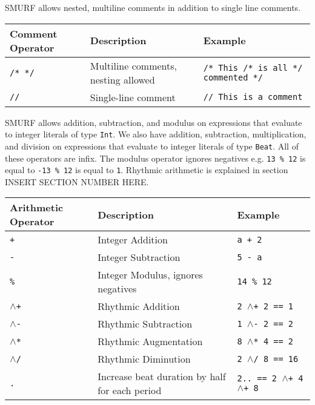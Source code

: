 SMURF allows nested, multiline comments in addition to single line comments.
\begin{table} [H]
\centering
\begin{tabularx}{\textwidth}{lXl}
\hline\hline
Comment Operator & Description & Example \\
\hline\hline
  \texttt{/* */} & Multiline comments, nesting allowed & \texttt{/* This /* is all */ commented */} \\ \hline
  \texttt{//} & Single-line comment & \texttt{// This is a comment} \\ \hline
\end{tabularx}
\end{table}

SMURF allows addition, subtraction, and modulus on expressions that evaluate to integer literals of type \texttt{Int}. We also have addition, subtraction,
multiplication, and division on expressions that evaluate to integer literals of type \texttt{Beat}. All of these operators are infix.
The modulus operator ignores negatives e.g. \texttt{13 \% 12} is equal to \texttt{-13 \% 12} is equal to \texttt{1}. Rhythmic arithmetic is explained
in section INSERT SECTION NUMBER HERE.
\begin{table} [H]
\centering
\begin{tabularx}{\textwidth}{lXX}
\hline\hline
Arithmetic Operator & Description & Example \\
\hline\hline
  \texttt{+} & Integer Addition  & \texttt{a + 2} \\ \hline
  \texttt{-} & Integer Subtraction  & \texttt{5 - a} \\ \hline 
  \texttt{\%} & Integer Modulus, ignores negatives  & \texttt{14 \% 12} \\ \hline
  \texttt{$\wedge$+} & Rhythmic Addition & \texttt{2 $\wedge$+ 2 == 1} \\ \hline
  \texttt{$\wedge$-} & Rhythmic Subtraction & \texttt{1 $\wedge$- 2 == 2}  \\ \hline
  \texttt{$\wedge$*} & Rhythmic Augmentation & \texttt{8 $\wedge$* 4 == 2}  \\ \hline
  \texttt{$\wedge$/} & Rhythmic Diminution & \texttt{2 $\wedge$/ 8 == 16}  \\ \hline
  \texttt{.} & Increase beat duration by half for each period & \texttt{2.. == 2 $\wedge$+ 4 $\wedge$+ 8}  \\ \hline
\end{tabularx}
\end{table}

